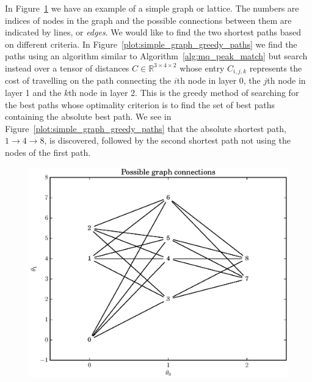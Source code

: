 \documentclass[letterpaper,12pt]{report}
\begin{document}
In Figure~\ref{plot:simple_graph} we have an example of a simple graph or
lattice. The numbers are indices of nodes in the graph and the possible
connections between them are indicated by lines, or \textit{edges}. We would like to find the two
shortest paths based on different criteria. In
Figure~\ref{plot:simple_graph_greedy_paths} we find the paths using an algorithm
similar to Algorithm~\ref{alg:mq_peak_match} but search instead over a tensor
of distances $C \in \mathbb{R}^{3 \times 4 \times 2}$ whose entry $C_{i,j,k}$
represents the cost of travelling on the path connecting the $i$th node in layer
0, the $j$th node in layer 1 and the $k$th node in layer 2. This is the greedy
method of searching for the best paths whose optimality criterion is to find the
set of best paths containing the absolute best path. We see in
Figure~\ref{plot:simple_graph_greedy_paths} that the absolute shortest path, $1
\rightarrow 4 \rightarrow 8$, is discovered, followed by the second shortest
path not using the nodes of the first path.

\begin{figure}
    \caption{\label{plot:simple_graph}}
    \includegraphics[width=\textwidth]{plots/small_graph_ex.eps}
\end{figure}
\end{document}
